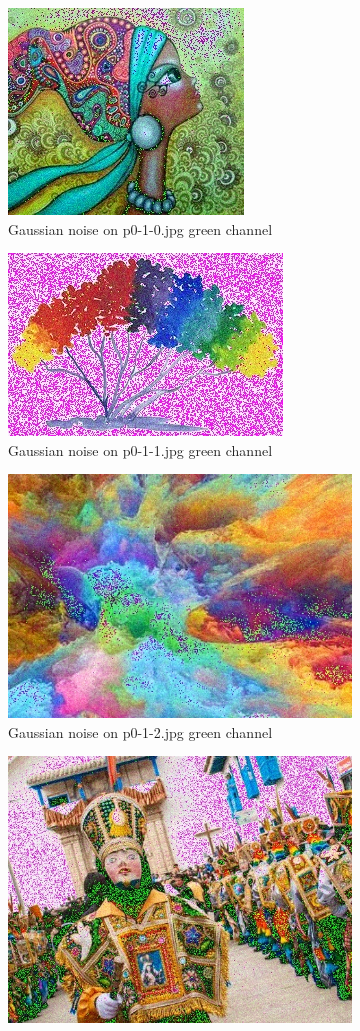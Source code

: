 \begin{enumerate}[label=\emph{\alph*)}]
\begin{figure}[h!]
\centering
  \begin{subfigure}{0.5\textwidth}
    \centering
    \includegraphics[width=0.5\linewidth]{../output/p0-5-a-0.jpg}
    \caption{Gaussian noise on p0-1-0.jpg green channel}
  \end{subfigure}%
\begin{subfigure}{0.5\textwidth}
  \centering
  \includegraphics[width=0.5\linewidth]{../output/p0-5-a-1.jpg}
  \caption{Gaussian noise on p0-1-1.jpg green channel}
  \label{fig:sfig2}
\end{subfigure}
\begin{subfigure}{0.5\textwidth}
  \centering
  \includegraphics[width=0.5\linewidth]{../output/p0-5-a-2.jpg}
  \caption{Gaussian noise on p0-1-2.jpg green channel}
  \label{fig:sfig1}
\end{subfigure}%
\begin{subfigure}{0.5\textwidth}
  \centering
  \includegraphics[width=0.5\linewidth]{../output/p0-5-a-3.jpg}

\end{subfigure}
\end{figure}
\end{enumerate}

